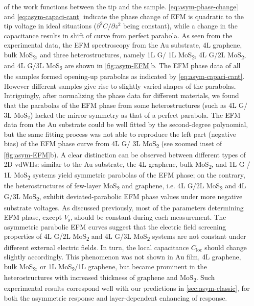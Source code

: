 of the work functions between the tip and the sample.
%
\autoref{eq:asym-phase-change} and \autoref{eq:asym-capaci-cant}
indicate the phase change of EFM is quadratic to the tip voltage in
ideal situations ($\partial^{2} C / \partial z^{2}$ being constant),
while a change in the capacitance results in shift of curve from perfect parabola.
%
As seen from the experimental data, the EFM spectroscopy from the Au
substrate, 4L graphene, bulk MoS\textsubscript{2}, and three
heterostructures, namely 1L G/ 1L MoS\textsubscript{2}, 4L G/2L
MoS\textsubscript{2}, and 4L G/3L MoS\textsubscript{2} are shown in
\autoref{fig:asym-EFM}b.  The EFM phase data of all the samples formed
opening-up parabolas as indicated by \autoref{eq:asym-capaci-cant}.
%
However different
samples give rise to slightly varied shapes of the parabolas.
%
Intriguingly, after normalizing the phase data for different
materials, we found that the parabolas of the EFM phase from some
heterostructures (such as 4L G/ 3L MoS$_{2}$) lacked the
mirror-symmetry as that of a perfect parabola.
%
The EFM data from the Au substrate could be well fitted by the
second-degree polynomial, but the same fitting process was not able to
reproduce the left part (negative bias) of the EFM phase curve from 4L
G/ 3L MoS\textsubscript{2} (see zoomed inset of
\autoref{fig:asym-EFM}b).
%
A clear distinction can be observed between different types of 2D
vdWHs: similar to the Au substrate, the 4L graphene, bulk
MoS\textsubscript{2}, and 1L G / 1L MoS\textsubscript{2} systems yield
symmetric parabolas of the EFM phase; on the contrary, the
heterostructures of few-layer MoS\textsubscript{2} and graphene,
i.e. 4L G/2L MoS\textsubscript{2} and 4L G/3L
MoS\textsubscript{2}, exhibit deviated-parabolic EFM phase
values under more negative substrate voltages.
%
%
As discussed previously, most of the parameters determining EFM phase,
except $V_{\mathrm{s}}$, should be constant during each
measurement. The asymmetric parabolic EFM curves suggest that the
electric field screening properties of 4L G/2L MoS\textsubscript{2} and 4L G/3L MoS\textsubscript{2} systems are not
constant under different external electric fields. In turn, the local capacitance $C_{\mathrm{loc}}$ should change slightly
accordingly. This phenomenon was not shown in Au film, 4L graphene,
bulk MoS\textsubscript{2}, or 1L MoS\textsubscript{2}/1L graphene, but
became prominent in the heterostructures with increased thickness of
graphene and MoS\textsubscript{2}.
%
Such experimental results correspond well with our predictions in
\autoref{sec:asym-classic}, for both the asymmetric response and
layer-dependent enhancing of response.


